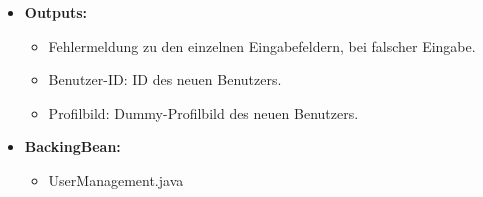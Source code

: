 \begin{itemize}
\begin{itemize}
							\end{itemize}
						\item \textbf{Outputs:}
							\begin{itemize}
								\item Fehlermeldung zu den einzelnen Eingabefeldern, bei falscher Eingabe.
								\item Benutzer-ID: ID des neuen Benutzers.
								\item Profilbild: Dummy-Profilbild des neuen Benutzers.
							\end{itemize}
						\item \textbf{BackingBean:}
							\begin{itemize}
								\item UserManagement.java
							\end{itemize}
					\end{itemize}
				

